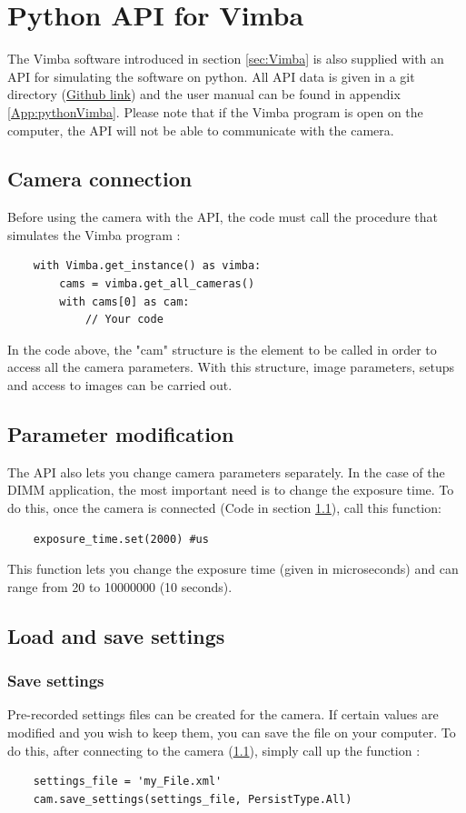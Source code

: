 \section{Python API for Vimba}
The Vimba software introduced in section \ref{sec:Vimba} is also supplied with an API for simulating the software on python.
All API data is given in a git directory (\href{https://github.com/alliedvision/VimbaPython}{Github link}) and the user manual
can be found in appendix \ref{App:pythonVimba}.\newline
Please note that if the Vimba program is open on the computer, the API will not be able to communicate with the camera.
\subsection{Camera connection}\label{sec:Soft_API_Connect}
Before using the camera with the API, the code must call the procedure that simulates the Vimba program :
\begin{verbatim}
    with Vimba.get_instance() as vimba:
        cams = vimba.get_all_cameras()
        with cams[0] as cam:
            // Your code
\end{verbatim}
In the code above, the "cam" structure is the element to be called in order to access all the camera parameters.
With this structure, image parameters, setups and access to images can be carried out.
\subsection{Parameter modification}
The API also lets you change camera parameters separately. In the case of the \Gls{DIMM} application, the most important
need is to change the exposure time. To do this, once the camera is connected (Code in section \ref{sec:Soft_API_Connect}),
call this function:
\begin{verbatim}
    exposure_time.set(2000) #us
\end{verbatim}
This function lets you change the exposure time (given in microseconds) and can range from 20 to 10000000 (10 seconds).
\subsection{Load and save settings}
\subsubsection{Save settings}
Pre-recorded settings files can be created for the camera. If certain values are modified and you wish to keep them,
you can save the file on your computer. To do this, after connecting to the camera (\ref{sec:Soft_API_Connect}),
simply call up the function :
\begin{verbatim}
    settings_file = 'my_File.xml'
    cam.save_settings(settings_file, PersistType.All)
\end{verbatim}
